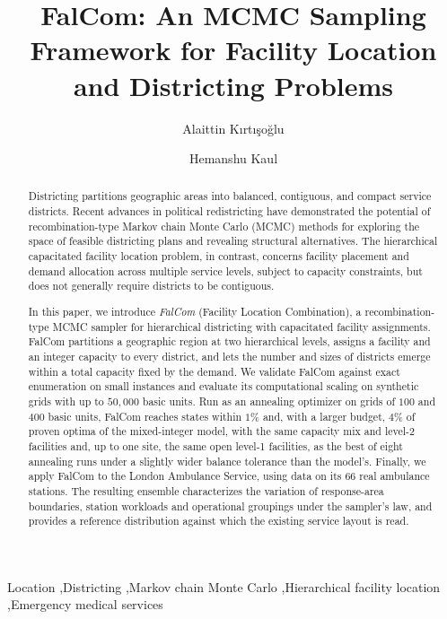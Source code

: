\documentclass[preprint,12pt,authoryear]{elsarticle}
\theoremstyle{definition}
\begin{document}


\begin{frontmatter}

\title{FalCom: An MCMC Sampling Framework for Facility Location and Districting Problems}

\author[iit]{Alaittin K\i rt\i \c{s}o\u{g}lu}
\author[iit]{Hemanshu Kaul}

\begin{abstract}
    Districting partitions geographic areas into balanced, contiguous, and compact 
    service districts. Recent advances in political redistricting have demonstrated 
    the potential of recombination-type Markov chain Monte Carlo (MCMC) methods for 
    exploring the space of feasible districting plans and revealing structural 
    alternatives. The hierarchical capacitated facility location problem, in 
    contrast, concerns facility placement and demand allocation across multiple 
    service levels, subject to capacity constraints, but does not generally require 
    districts to be contiguous.

    In this paper, we introduce \emph{FalCom} (Facility Location Combination), a 
    recombination-type MCMC sampler for hierarchical districting with capacitated 
    facility assignments. FalCom partitions a geographic region at two hierarchical levels, assigns a facility and an integer capacity to every district, and lets the number and sizes of districts emerge within a total capacity fixed by the demand. We validate FalCom against exact enumeration on small 
    instances and evaluate its computational scaling on synthetic grids with up 
    to $50{,}000$ basic units. Run as an annealing optimizer on grids of $100$ and $400$ basic units, FalCom reaches states within $1\%$ and, with a larger budget, $4\%$ of proven optima of the mixed-integer model, with the same capacity mix and level-2 facilities and, up to one site, the same open level-1 facilities, as the best of eight annealing runs under a slightly wider balance tolerance than the model's. 
    Finally, we apply FalCom to the London Ambulance Service, using data on its $66$ 
    real ambulance stations. The resulting ensemble characterizes the variation of response-area boundaries, station workloads and operational groupings under the sampler's law, and provides a reference distribution against which the existing service layout is read.
\end{abstract}

\begin{keyword}
Location \sep Districting \sep Markov chain Monte Carlo \sep Hierarchical facility location \sep Emergency medical services
\end{keyword}

\end{frontmatter}
\end{document}
